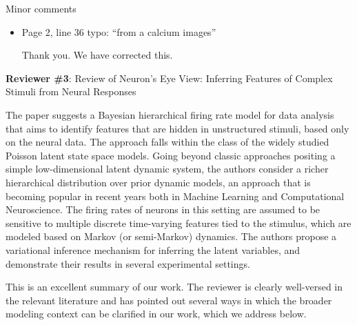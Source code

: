 \documentclass[12pt,a4paper]{article}
\newcommand{\edit}[1]{\textcolor{edit}{#1}}
\begin{document}
Minor comments
\begin{itemize}
    \item Page 2, line 36 typo: “from a calcium images”

    \edit{Thank you. We have corrected this.}
\end{itemize}

{\bf Reviewer \#3}: Review of Neuron's Eye View: Inferring Features of Complex Stimuli from Neural Responses

The paper suggests a Bayesian hierarchical firing rate model for data analysis that aims to identify features that are hidden in unstructured stimuli, based only on the neural data. The approach falls within the class of the widely studied Poisson latent state space models. Going beyond classic approaches positing a simple low-dimensional latent dynamic system, the authors consider a richer hierarchical distribution over prior dynamic models, an approach that is becoming popular in recent years both in Machine Learning and Computational Neuroscience. The firing rates of neurons in this setting are assumed to be sensitive to multiple discrete time-varying features tied to the stimulus, which are modeled based on Markov (or semi-Markov) dynamics. The authors propose a variational inference mechanism for inferring the latent variables, and demonstrate their results in several experimental settings.

\edit{
This is an excellent summary of our work. The reviewer is clearly well-versed in the relevant literature and has pointed out several ways in which the broader modeling context can be clarified in our work, which we address below.
}
\end{document}

